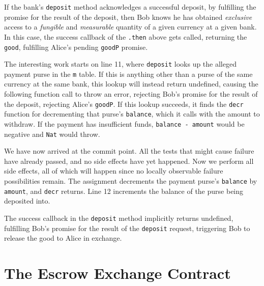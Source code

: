 \documentclass{llncs}
\begin{document}
If the bank's {\tt deposit} method acknowledges a successful deposit, by fulfilling the promise for the result of the deposit, then Bob knows he has obtained \emph{exclusive} access to a \emph{fungible} and \emph{measurable} quantity of a given currency at a given bank. In this case, the success callback of the {\tt .then} above gets called, returning the {\tt good}, fulfilling Alice's pending {\tt goodP} promise.

The interesting work starts on line 11, where {\tt deposit} looks up the alleged payment purse in the {\tt m} table. If this is anything other than a purse of the same currency at the same bank, this lookup will instead return undefined, causing the following function call to throw an error, rejecting Bob's promise for the result of the deposit, rejecting Alice's {\tt goodP}. If this lookup succeeds, it finds the {\tt decr} function for decrementing that purse's {\tt balance}, which it calls with the amount to withdraw. If the payment has insufficient funds, {\tt balance - amount} would be negative and {\tt Nat} would throw.

We have now arrived at the commit point. All the tests that might cause failure have already passed, and no side effects have yet happened. Now we perform all side effects, all of which will happen since no locally observable failure possibilities remain. The assignment decrements the payment purse's {\tt balance} by {\tt amount}, and {\tt decr} returns. Line 12 increments the balance of the purse being deposited into.

The success callback in the {\tt deposit} method implicitly returns undefined, fulfilling Bob's promise for the result of the {\tt deposit} request, triggering Bob to release the good to Alice in exchange.



\section{The Escrow Exchange Contract}
\label{exchange}
\end{document}
